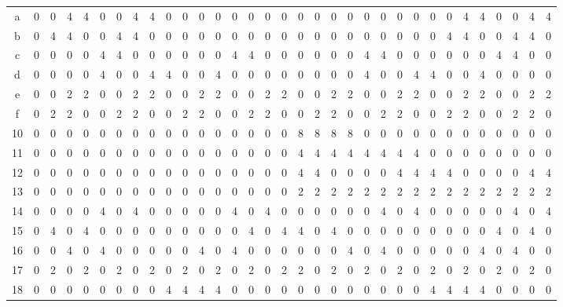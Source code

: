 \documentclass[11pt]{article}
\begin{document}
\begin{table}[htbp]
{\begin{tabular}{c|*{32}{c}}
    a & 0 & 0 & 4 & 4 & 0 & 0 & 4 & 4 & 0 & 0 & 0 & 0 & 0 & 0 & 0 & 0 & 0 & 0 & 0 & 0 & 0 & 0 & 0 & 0 & 0 & 0 & 4 & 4 & 0 & 0 & 4 & 4 \\
    b & 0 & 4 & 4 & 0 & 0 & 4 & 4 & 0 & 0 & 0 & 0 & 0 & 0 & 0 & 0 & 0 & 0 & 0 & 0 & 0 & 0 & 0 & 0 & 0 & 0 & 4 & 4 & 0 & 0 & 4 & 4 & 0 \\
    c & 0 & 0 & 0 & 0 & 4 & 4 & 0 & 0 & 0 & 0 & 0 & 0 & 4 & 4 & 0 & 0 & 0 & 0 & 0 & 0 & 4 & 4 & 0 & 0 & 0 & 0 & 0 & 0 & 4 & 4 & 0 & 0 \\
    d & 0 & 0 & 0 & 0 & 4 & 0 & 0 & 4 & 4 & 0 & 0 & 4 & 0 & 0 & 0 & 0 & 0 & 0 & 0 & 0 & 4 & 0 & 0 & 4 & 4 & 0 & 0 & 4 & 0 & 0 & 0 & 0 \\
    e & 0 & 0 & 2 & 2 & 0 & 0 & 2 & 2 & 0 & 0 & 2 & 2 & 0 & 0 & 2 & 2 & 0 & 0 & 2 & 2 & 0 & 0 & 2 & 2 & 0 & 0 & 2 & 2 & 0 & 0 & 2 & 2 \\
    f & 0 & 2 & 2 & 0 & 0 & 2 & 2 & 0 & 0 & 2 & 2 & 0 & 0 & 2 & 2 & 0 & 0 & 2 & 2 & 0 & 0 & 2 & 2 & 0 & 0 & 2 & 2 & 0 & 0 & 2 & 2 & 0 \\
    10 & 0 & 0 & 0 & 0 & 0 & 0 & 0 & 0 & 0 & 0 & 0 & 0 & 0 & 0 & 0 & 0 & 8 & 8 & 8 & 8 & 0 & 0 & 0 & 0 & 0 & 0 & 0 & 0 & 0 & 0 & 0 & 0 \\
    11 & 0 & 0 & 0 & 0 & 0 & 0 & 0 & 0 & 0 & 0 & 0 & 0 & 0 & 0 & 0 & 0 & 4 & 4 & 4 & 4 & 4 & 4 & 4 & 4 & 0 & 0 & 0 & 0 & 0 & 0 & 0 & 0 \\
    12 & 0 & 0 & 0 & 0 & 0 & 0 & 0 & 0 & 0 & 0 & 0 & 0 & 0 & 0 & 0 & 0 & 4 & 4 & 0 & 0 & 0 & 0 & 4 & 4 & 4 & 4 & 0 & 0 & 0 & 0 & 4 & 4 \\
    13 & 0 & 0 & 0 & 0 & 0 & 0 & 0 & 0 & 0 & 0 & 0 & 0 & 0 & 0 & 0 & 0 & 2 & 2 & 2 & 2 & 2 & 2 & 2 & 2 & 2 & 2 & 2 & 2 & 2 & 2 & 2 & 2 \\
    14 & 0 & 0 & 0 & 0 & 4 & 0 & 4 & 0 & 0 & 0 & 0 & 0 & 4 & 0 & 4 & 0 & 0 & 0 & 0 & 0 & 0 & 4 & 0 & 4 & 0 & 0 & 0 & 0 & 0 & 4 & 0 & 4 \\
    15 & 0 & 4 & 0 & 4 & 0 & 0 & 0 & 0 & 0 & 0 & 0 & 0 & 0 & 4 & 0 & 4 & 4 & 0 & 4 & 0 & 0 & 0 & 0 & 0 & 0 & 0 & 0 & 0 & 4 & 0 & 4 & 0 \\
    16 & 0 & 0 & 4 & 0 & 4 & 0 & 0 & 0 & 0 & 0 & 4 & 0 & 4 & 0 & 0 & 0 & 0 & 0 & 0 & 4 & 0 & 4 & 0 & 0 & 0 & 0 & 0 & 4 & 0 & 4 & 0 & 0 \\
    17 & 0 & 2 & 0 & 2 & 0 & 2 & 0 & 2 & 0 & 2 & 0 & 2 & 0 & 2 & 0 & 2 & 2 & 0 & 2 & 0 & 2 & 0 & 2 & 0 & 2 & 0 & 2 & 0 & 2 & 0 & 2 & 0 \\
    18 & 0 & 0 & 0 & 0 & 0 & 0 & 0 & 0 & 4 & 4 & 4 & 4 & 0 & 0 & 0 & 0 & 0 & 0 & 0 & 0 & 0 & 0 & 0 & 0 & 4 & 4 & 4 & 4 & 0 & 0 & 0 & 0 \\

\end{tabular}}
\end{table}
\end{document}
